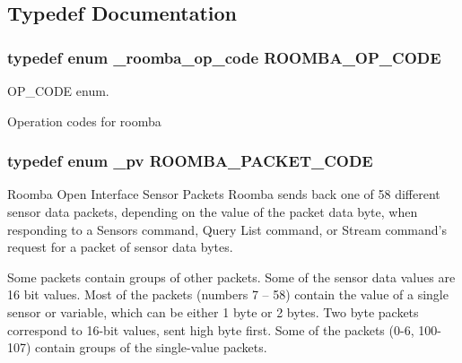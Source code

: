 \subsection{Typedef Documentation}
\hypertarget{group__roomba-lib_gaa48d04e007e0ae60ee9bc055a5a159fe}{}
\subsubsection[{R\+O\+O\+M\+B\+A\+\_\+\+O\+P\+\_\+\+C\+O\+D\+E}]{\setlength{\rightskip}{0pt plus 5cm}typedef enum {\bf \+\_\+roomba\+\_\+op\+\_\+code}  {\bf R\+O\+O\+M\+B\+A\+\_\+\+O\+P\+\_\+\+C\+O\+D\+E}}\label{group__roomba-lib_gaa48d04e007e0ae60ee9bc055a5a159fe}


O\+P\+\_\+\+C\+O\+D\+E enum. 

Operation codes for roomba \hypertarget{group__roomba-lib_gada33faf3aeb650fa045d8516c6257174}{}
\subsubsection[{R\+O\+O\+M\+B\+A\+\_\+\+P\+A\+C\+K\+E\+T\+\_\+\+C\+O\+D\+E}]{\setlength{\rightskip}{0pt plus 5cm}typedef enum {\bf \+\_\+pv}  {\bf R\+O\+O\+M\+B\+A\+\_\+\+P\+A\+C\+K\+E\+T\+\_\+\+C\+O\+D\+E}}\label{group__roomba-lib_gada33faf3aeb650fa045d8516c6257174}


Roomba Open Interface Sensor Packets Roomba sends back one of 58 different sensor data packets, depending on the value of the packet data byte, when responding to a Sensors command, Query List command, or Stream command’s request for a packet of sensor data bytes. 

Some packets contain groups of other packets. Some of the sensor data values are 16 bit values. Most of the packets (numbers 7 – 58) contain the value of a single sensor or variable, which can be either 1 byte or 2 bytes. Two byte packets correspond to 16-\/bit values, sent high byte first. Some of the packets (0-\/6, 100-\/107) contain groups of the single-\/value packets.

